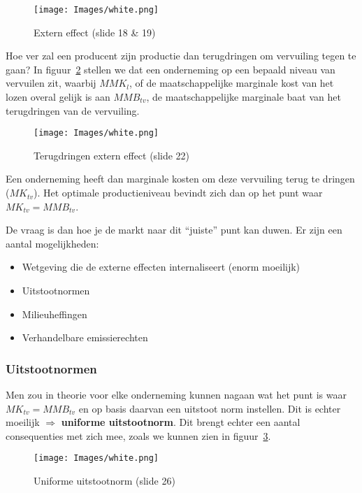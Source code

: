 \begin{figure}[htbp]
   \centering
   \texttt{[image: Images/white.png]}
   \caption{Extern effect (slide 18 \& 19)}
   \label{fig:externEffect}
\end{figure}

Hoe ver zal een producent zijn productie dan terugdringen om vervuiling tegen te gaan? In figuur~\ref{fig:terugdringenExternEffect} stellen we dat een onderneming op een bepaald niveau van vervuilen zit, waarbij $MMK_l$, of de maatschappelijke marginale kost van het lozen overal gelijk is aan $MMB_{tv}$, de maatschappelijke marginale baat van het terugdringen van de vervuiling.

\begin{figure}[htbp]
   \centering
   \texttt{[image: Images/white.png]}
   \caption{Terugdringen extern effect (slide 22)}
   \label{fig:terugdringenExternEffect}
\end{figure}

Een onderneming heeft dan marginale kosten om deze vervuiling terug te dringen ($MK_{tv}$). Het optimale productieniveau bevindt zich dan op het punt waar $MK_{tv} = MMB_{tv}$.

De vraag is dan hoe je de markt naar dit ``juiste'' punt kan duwen. Er zijn een aantal mogelijkheden:
\begin{itemize}
   \item Wetgeving die de externe effecten internaliseert (enorm moeilijk)
   \item Uitstootnormen
   \item Milieuheffingen
   \item Verhandelbare emissierechten
\end{itemize}

\subsubsection{Uitstootnormen}
Men zou in theorie voor elke onderneming kunnen nagaan wat het punt is waar $MK_{tv} = MMB_{tv}$ en op basis daarvan een uitstoot norm instellen. Dit is echter moeilijk $\Rightarrow$ \textbf{uniforme uitstootnorm}. Dit brengt echter een aantal consequenties met zich mee, zoals we kunnen zien in figuur~\ref{fig:uniformeUitstootnorm}.

\begin{figure}[htbp]
   \centering
   \texttt{[image: Images/white.png]}
   \caption{Uniforme uitstootnorm (slide 26)}
   \label{fig:uniformeUitstootnorm}
\end{figure}

